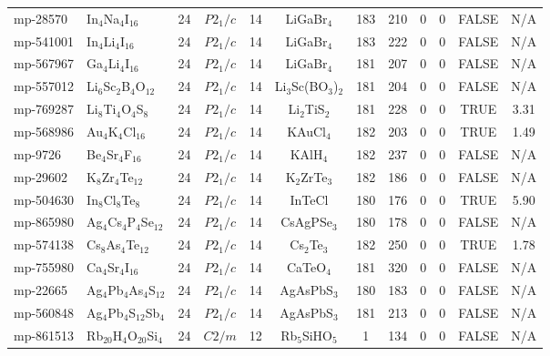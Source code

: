 {\begin{longtable}{llcccccccccc}
    mp-28570 & In$_{4}$Na$_{4}$I$_{16}$ & 24    & $P2_1/c$ & 14    & LiGaBr$_{4}$ & 183   & 210   & 0     & 0     & FALSE & N/A \\
    mp-541001 & In$_{4}$Li$_{4}$I$_{16}$ & 24    & $P2_1/c$ & 14    & LiGaBr$_{4}$ & 183   & 222   & 0     & 0     & FALSE & N/A \\
    mp-567967 & Ga$_{4}$Li$_{4}$I$_{16}$ & 24    & $P2_1/c$ & 14    & LiGaBr$_{4}$ & 181   & 207   & 0     & 0     & FALSE & N/A \\
    mp-557012 & Li$_{6}$Sc$_{2}$B$_{4}$O$_{12}$ & 24    & $P2_1/c$ & 14    & Li$_{3}$Sc(BO$_{3}$)$_{2}$ & 181   & 204   & 0     & 0     & FALSE & N/A \\
    mp-769287 & Li$_{8}$Ti$_{4}$O$_{4}$S$_{8}$ & 24    & $P2_1/c$ & 14    & Li$_{2}$TiS$_{2}$ & 181   & 228   & 0     & 0     & TRUE  & 3.31  \\
    mp-568986 & Au$_{4}$K$_{4}$Cl$_{16}$ & 24    & $P2_1/c$ & 14    & KAuCl$_{4}$ & 182   & 203   & 0     & 0     & TRUE  & 1.49  \\
    mp-9726 & Be$_{4}$Sr$_{4}$F$_{16}$ & 24    & $P2_1/c$ & 14    & KAlH$_{4}$ & 182   & 237   & 0     & 0     & FALSE & N/A \\
    mp-29602 & K$_{8}$Zr$_{4}$Te$_{12}$ & 24    & $P2_1/c$ & 14    & K$_{2}$ZrTe$_{3}$ & 182   & 186   & 0     & 0     & FALSE & N/A \\
    mp-504630 & In$_{8}$Cl$_{8}$Te$_{8}$ & 24    & $P2_1/c$ & 14    & InTeCl & 180   & 176   & 0     & 0     & TRUE  & 5.90  \\
    mp-865980 & Ag$_{4}$Cs$_{4}$P$_{4}$Se$_{12}$ & 24    & $P2_1/c$ & 14    & CsAgPSe$_{3}$ & 180   & 178   & 0     & 0     & FALSE & N/A \\
    mp-574138 & Cs$_{8}$As$_{4}$Te$_{12}$ & 24    & $P2_1/c$ & 14    & Cs$_{2}$Te$_{3}$ & 182   & 250   & 0     & 0     & TRUE  & 1.78  \\
    mp-755980 & Ca$_{4}$Sr$_{4}$I$_{16}$ & 24    & $P2_1/c$ & 14    & CaTeO$_{4}$ & 181   & 320   & 0     & 0     & FALSE & N/A \\
    mp-22665 & Ag$_{4}$Pb$_{4}$As$_{4}$S$_{12}$ & 24    & $P2_1/c$ & 14    & AgAsPbS$_{3}$ & 180   & 183   & 0     & 0     & FALSE & N/A \\
    mp-560848 & Ag$_{4}$Pb$_{4}$S$_{12}$Sb$_{4}$ & 24    & $P2_1/c$ & 14    & AgAsPbS$_{3}$ & 181   & 213   & 0     & 0     & FALSE & N/A \\
    mp-861513 & Rb$_{20}$H$_{4}$O$_{20}$Si$_{4}$ & 24    & $C2/m$ & 12    & Rb$_{5}$SiHO$_{5}$ & 1     & 134   & 0     & 0     & FALSE & N/A \\

\end{longtable}}
